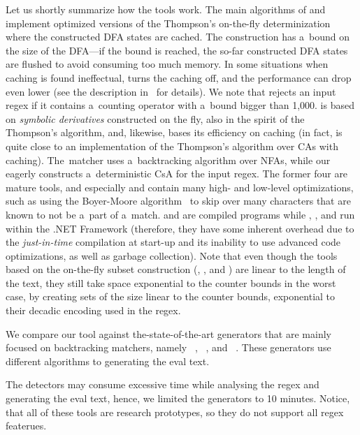\documentclass[acmsmall,screen]{acmart}
\begin{document}
Let us shortly summarize how the tools work.
The main algorithms of
\retwo and \grep implement optimized versions of the Thompson's on-the-fly
determinization where the constructed DFA states are cached.
The construction has a~bound on the size of the DFA---if the bound is reached,
the so-far constructed DFA states are flushed to avoid consuming too much
memory.
In some situations when caching is found ineffectual, \retwo turns the caching
off,
and the performance can drop even lower 
 (see the description in~\cite{regexes-in-the-wild} for details).
We note that \retwo rejects an input regex if it contains a~counting
operator with a~bound bigger than 1,000.
%
\srm is based on \emph{symbolic derivatives} constructed on the fly, 
also in the spirit of the Thompson's algorithm, and, likewise, bases its efficiency
on caching
(in fact, \srm is quite close to an implementation of the Thompson's
algorithm over CAs with caching).
The~\dotnet matcher uses a~backtracking algorithm over NFAs, while
%
our \catool eagerly constructs a~deterministic CsA for the input regex.
%
The former four are mature tools, and especially \retwo and \grep contain many high- and low-level
optimizations, such as using the Boyer-Moore algorithm~\cite{BoyerM77} to skip
over many characters that are known to not be a~part of a~match.
%
\retwo and \grep are compiled programs while \catool, \srm, and
\dotnet run within the .NET Framework (therefore, they have some inherent
overhead due to the \emph{just-in-time} compilation at start-up and its
inability to use advanced code optimizations, as well as 
garbage collection). 
%
Note that even though the tools based on the on-the-fly subset construction (\retwo, \grep, and \srm) are linear to the length of the text, they still take space exponential to the counter bounds in the worst case, by creating sets of the size linear to the counter bounds, exponential to their decadic encoding used in the regex. 


We compare our tool against the-state-of-the-art generators that are mainly focused on backtracking matchers, namely
%
\rex~\cite{rex}, \regexStatic~\cite{regexStatic}, and \rexploiter~\cite{rexploiter}.
%
These generators use different algorithms to generating the eval text.
%

The detectors may consume excessive time while analysing the regex and generating the eval text,
%
hence, we limited the generators to 10 minutes.
% 
Notice, that all of these tools are research prototypes, so they do not support all regex featerues.
\end{document}
